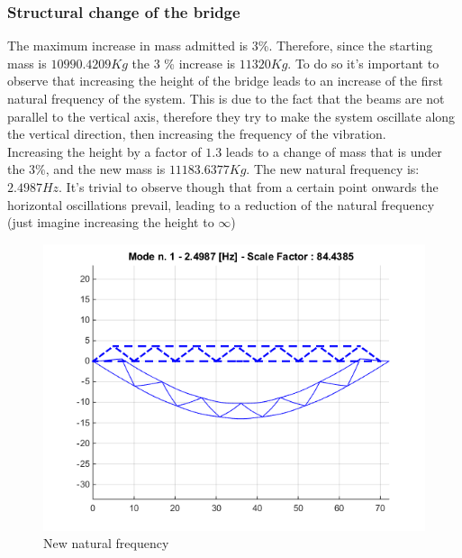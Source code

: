 \documentclass[10pt,a4paper,final]{report}
\begin{document}
\subsubsection{Structural change of the bridge}
The maximum increase in mass admitted is 3\%. Therefore, since the starting mass is $10990.4209 Kg$ the 3 \% increase is $11320 Kg$.
To do so it's important to observe that increasing the height of the bridge leads to an increase of the first natural frequency of the system. This is due to the fact that the beams are not parallel to the vertical axis, therefore they try to make the system oscillate along the vertical direction, then increasing the frequency of the vibration.
\\
Increasing the height by a factor of $1.3$ leads to a change of mass that is under the $3\%$, and the new mass is $11183.6377 Kg$. The new natural frequency is: $2.4987 Hz$. It's trivial to observe though that from a certain point onwards the horizontal oscillations prevail, leading to a reduction of the natural frequency (just imagine increasing the height to $\infty$)
\\
\begin{figure}[h]
        \centering
                \includegraphics[width=\textwidth]{structuralchangea1}
                \caption{New natural frequency}
                \label{fig:newqfreqa}
\end{figure}
\end{document}
